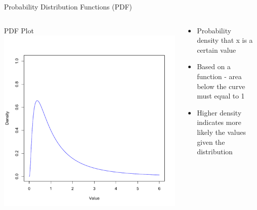 \documentclass{beamer}
\begin{document}
\begin{frame}{Probability Distribution Functions (PDF)}
\begin{columns}    
	\begin{column}{4cm}        
		\begin{center}
		PDF Plot           
	 	\includegraphics[width=1.0\textwidth]{Figure2}        
		\end{center}   
	 \end{column}    
	\begin{column}{5cm}        
	  
	\begin{itemize}
	\item Probability density that x is a certain value
	\item Based on a function - area below the curve must equal to 1
	\item Higher density indicates more likely the values given the distribution
	\end{itemize}
	\end{column}
	\end{columns}

\end{frame}
\end{document}
